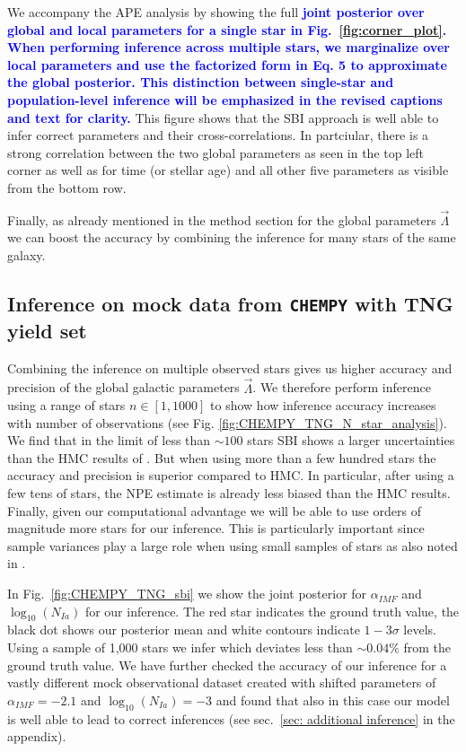 \documentclass{aa}
\newcommand{\resub}[1]{\textbf{\textcolor{blue}{#1}}}
\begin{document}
We accompany the APE analysis by showing the full \resub{joint posterior over global and local parameters for a single star in Fig.~\ref{fig:corner_plot}. When performing inference across multiple stars, we marginalize over local parameters and use the factorized form in Eq. 5 to approximate the global posterior. This distinction between single-star and population-level inference will be emphasized in the revised captions and text for clarity.}
This figure shows that the SBI approach is well able to infer correct parameters and their cross-correlations. In partciular, there is a strong correlation between the two global parameters as seen in the top left corner as well as for time (or stellar age) and all other five parameters as visible from the bottom row.

Finally, as already mentioned in the method section for the global parameters $\vec\Lambda$ we can boost the accuracy by combining the inference for many stars of the same galaxy.




\subsection{Inference on mock data from \texttt{CHEMPY} with TNG yield set}
\label{subsec:chempy_tng}
%
Combining the inference on multiple observed stars gives us higher accuracy and precision of the global galactic parameters $\vec\Lambda$. We therefore perform inference using a range of stars $n\in[1,1000]$ to show how inference accuracy increases with number of observations (see Fig. \ref{fig:CHEMPY_TNG_N_star_analysis}). We find that in the limit of less than $\sim100$ stars SBI shows a larger uncertainties than the HMC results of \citet{Philcox_2019}. But when using more than a few hundred stars the accuracy and precision is superior compared to HMC. In particular, after using a few tens of stars, the NPE estimate is already less biased than the HMC results. 
Finally, given our computational advantage we will be able to use orders of magnitude more stars for our inference.
This is particularly important since sample variances play a large role when using small samples of stars as also noted in \citet{Philcox_2019}.
%

In Fig.~\ref{fig:CHEMPY_TNG_sbi} we show the joint posterior for $\alpha_{IMF}$ and $\log_{10}(N_{Ia})$ for our inference. The red star indicates the ground truth value, the black dot shows our posterior mean and white contours indicate $1-3\sigma$ levels.
%
Using a sample of 1,000 stars we infer  which deviates less than $\sim0.04\%$ from the ground truth value. We have further checked the accuracy of our inference for a vastly different mock observational dataset created with shifted parameters of $\alpha_{IMF}=-2.1$ and $\log_{10}(N_{Ia})=-3$ and found that also in this case our model is well able to lead to correct inferences (see sec.~\ref{sec: additional inference} in the appendix).
\end{document}
